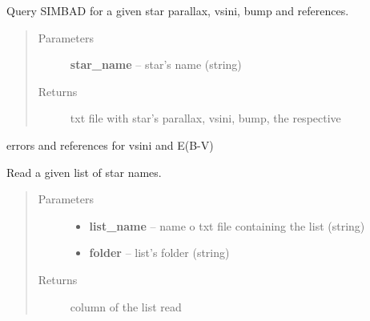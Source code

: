 \documentclass[letterpaper,10pt,english]{sphinxmanual}
\begin{document}
\begin{fulllineitems}
\label{index:BeFaVOr_web.read_simbad_data}
Query SIMBAD for a given star parallax, vsini, bump and references.
\begin{quote}\begin{description}
\item[{Parameters}] \leavevmode
\textbf{star\_name} -- star's name (string)

\item[{Returns}] \leavevmode
txt file with star's parallax, vsini, bump, the respective

\end{description}\end{quote}

errors and references for vsini and E(B-V)

\end{fulllineitems}


\begin{fulllineitems}
\label{index:BeFaVOr_web.read_txt}
Read a given list of star names.
\begin{quote}\begin{description}
\item[{Parameters}] \leavevmode\begin{itemize}
\item {} 
\textbf{list\_name} -- name o txt file containing the list (string)

\item {} 
\textbf{folder} -- list's folder (string)

\end{itemize}

\item[{Returns}] \leavevmode
column of the list read

\end{description}\end{quote}

\end{fulllineitems}

\end{document}

